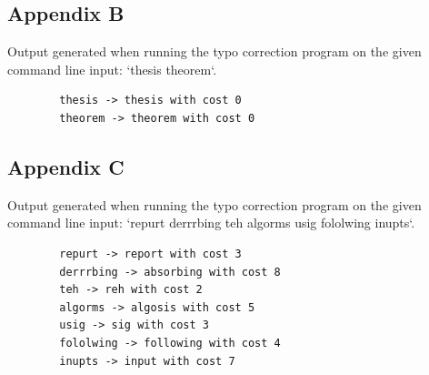 \documentclass[12pt,letterpaper]{article}
\begin{document}
\subsection*{Appendix B}
    Output generated when running the typo correction program on the given command line input: `thesis theorem`.
    \begin{footnotesize}
        \begin{verbatim}
        thesis -> thesis with cost 0
        theorem -> theorem with cost 0
        \end{verbatim}
    \end{footnotesize}
    
\subsection*{Appendix C}
    Output generated when running the typo correction program on the given command line input: `repurt derrrbing teh algorms usig fololwing inupts`.
    \begin{footnotesize}
        \begin{verbatim}
        repurt -> report with cost 3
        derrrbing -> absorbing with cost 8
        teh -> reh with cost 2
        algorms -> algosis with cost 5
        usig -> sig with cost 3
        fololwing -> following with cost 4
        inupts -> input with cost 7
        \end{verbatim}
    \end{footnotesize}
    
\pagebreak
\end{document}
